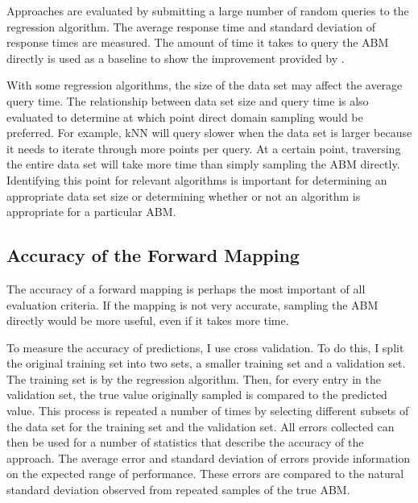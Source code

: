 Approaches are evaluated by submitting a large number of random queries to the regression algorithm.
The average response time and standard deviation of response times are measured.
The amount of time it takes to query the ABM directly is used as a baseline to show the improvement provided by \fw.


With some regression algorithms, the size of the data set may affect the average query time.
The relationship between data set size and query time is also evaluated to determine at which point direct domain sampling would be preferred.
For example, kNN will query slower when the data set is larger because it needs to iterate through more points per query.
At a certain point, traversing the entire data set will take more time than simply sampling the ABM directly.
Identifying this point for relevant algorithms is important for determining an appropriate data set size or determining whether or not an algorithm is appropriate for a particular ABM.

\subsection{Accuracy of the Forward Mapping}
The accuracy of a forward mapping is perhaps the most important of all evaluation criteria.
If the mapping is not very accurate, sampling the ABM directly would be more useful, even if it takes more time.

To measure the accuracy of predictions, I use cross validation.
To do this, I split the original training set into two sets, a smaller training set and a validation set.
The training set is by the regression algorithm.
Then, for every entry in the validation set, the true value originally sampled is compared to the predicted value.
This process is repeated a number of times by selecting different subsets of the data set for the training set and the validation set.
All errors collected can then be used for a number of statistics that describe the accuracy of the approach.
The average error and standard deviation of errors provide information on the expected range of performance.
These errors are compared to the natural standard deviation observed from repeated samples of the true ABM. 

